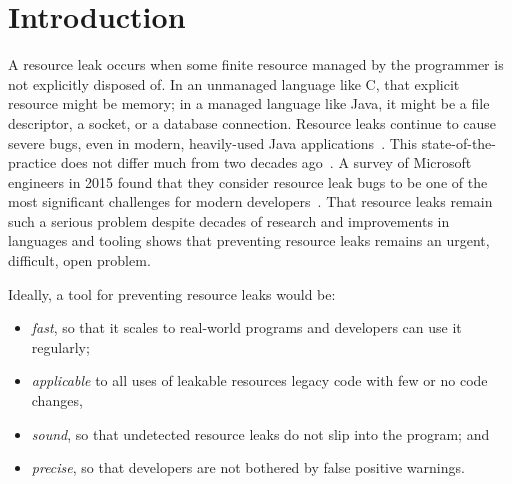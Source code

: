 \section{Introduction}
\label{sec:intro}


A resource leak occurs when some finite resource managed by the
programmer is not explicitly disposed of. In an unmanaged language
like C, that explicit resource might be memory; in a managed language
like Java, it might be a file descriptor, a socket, or a database
connection.  Resource leaks continue to cause severe bugs, even in
modern, heavily-used Java applications~\cite{ghanavati2020memory}.
This state-of-the-practice does not differ much from two decades
ago~\cite{WeimerN04}. 
A survey of Microsoft engineers in 2015 found
that they consider resource leak bugs to be one of the most
significant challenges for modern developers~\cite{LoNZ2015}.  That
resource leaks remain such a serious problem despite decades of
research and improvements in languages and tooling shows that
preventing resource leaks remains an urgent, difficult, open problem.


Ideally, a tool for preventing resource leaks would be:
\begin{itemize}
\item \emph{fast}, so that it scales to real-world programs and
  developers can use it regularly;
\item \emph{applicable} to all uses of leakable resources legacy code with few or no code changes,
\item \emph{sound}, so that undetected resource leaks do not slip into
  the program; and
\item \emph{precise}, so that developers are not bothered by false positive
  warnings.
\end{itemize}


